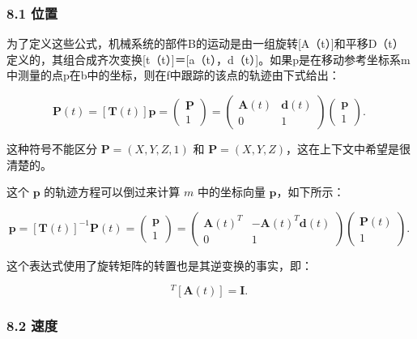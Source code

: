 \subsubsection{8.1 位置}

为了定义这些公式，机械系统的部件B的运动是由一组旋转[A（t）]和平移D（t）定义的，其组合成齐次变换[t（t）]＝[a（t），d（t）]。如果p是在移动参考坐标系m中测量的点p在b中的坐标，则在f中跟踪的该点的轨迹由下式给出：

\begin{equation}
\mathbf{P}(t) = [\mathbf{T}(t)] \mathbf{p} = 
\begin{pmatrix}
\mathbf{P} \\
1 
\end{pmatrix} = 
\begin{pmatrix}
\mathbf{A}(t) & \mathbf{d}(t) \\
0 & 1 
\end{pmatrix}
\begin{pmatrix}
\mathbf{p} \\
1 
\end{pmatrix}.~
\end{equation}

这种符号不能区分 $\mathbf{P} = (X, Y, Z, 1)$ 和 $\mathbf{P} = (X, Y, Z)$，这在上下文中希望是很清楚的。

这个 $\mathbf{p}$ 的轨迹方程可以倒过来计算 $m$ 中的坐标向量 $\mathbf{p}$，如下所示：

\begin{equation}
\mathbf{p} = [\mathbf{T}(t)]^{-1} \mathbf{P}(t) = 
\begin{pmatrix}
\mathbf{p} \\
1 
\end{pmatrix} = 
\begin{pmatrix}
\mathbf{A}(t)^T & -\mathbf{A}(t)^T \mathbf{d}(t) \\
0 & 1 
\end{pmatrix}
\begin{pmatrix}
\mathbf{P}(t) \\
1 
\end{pmatrix}.~
\end{equation}

这个表达式使用了旋转矩阵的转置也是其逆变换的事实，即：

\begin{equation}
[\mathbf{A}(t)]^T [\mathbf{A}(t)] = \mathbf{I}.~
\end{equation}

\subsubsection{8.2 速度}

